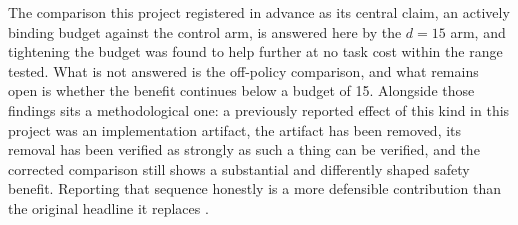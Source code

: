 The comparison this project registered in advance as its central claim, an actively binding
budget against the control arm, is answered here by the \(d=15\) arm, and tightening the budget
was found to help further at no task cost within the range tested. What is not answered is the
off-policy comparison, and what remains open is whether the benefit continues below a budget of
15. Alongside those findings sits a methodological one: a previously reported effect of this kind
in this project was an implementation artifact, the artifact has been removed, its removal has
been verified as strongly as such a thing can be verified, and the corrected comparison still
shows a substantial and differently shaped safety benefit. Reporting that sequence honestly is a
more defensible contribution than the original headline it replaces
\cite{khan2026rl_precision_grasping}.
